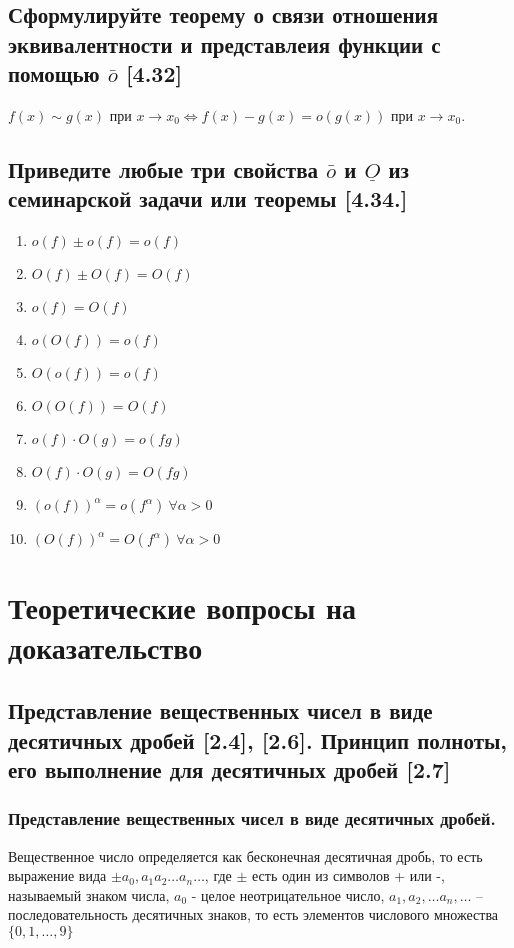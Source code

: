 \documentclass[12pt, a4paper]{article}
\begin{document}
    \subsection{Сформулируйте теорему о связи отношения эквивалентности и представлеия функции с помощью $\bar{o}$ [4.32]}
    $f(x) \sim g(x)$ при $x \to x_0 \Leftrightarrow f(x) - g(x) = o(g(x))$ при $x \to x_0$.
    \subsection{Приведите любые три свойства $\bar{o}$ и $\underline{O}$ из семинарской задачи или теоремы [4.34.]}
    \begin{enumerate}
        \item $o(f) \pm o(f) = o(f)$
        \item $O(f) \pm O(f) = O(f)$
        \item $o(f) = O(f)$
        \item $o(O(f)) = o(f)$
        \item $O(o(f)) = o(f)$
        \item $O(O(f)) = O(f)$
        \item $o(f) \cdot O(g) = o(fg)$
        \item $O(f) \cdot O(g) = O(fg)$
        \item $(o(f))^{\alpha} = o(f^{\alpha}) \ \forall \alpha > 0$
        \item $(O(f))^{\alpha} = O(f^{\alpha}) \ \forall \alpha > 0$
    \end{enumerate}
    \section{Теоретические вопросы на доказательство}
    \subsection{Представление вещественных чисел в виде десятичных дробей [2.4], [2.6]. Принцип полноты, его выполнение для десятичных дробей [2.7]}
    \subsubsection{Представление вещественных чисел в виде десятичных дробей.}
    Вещественное число определяется как бесконечная десятичная дробь, то есть выражение вида $\pm a_0, a_1 a_2 \dots a_n \dots$, где $\pm$ есть один из символов + или -, называемый знаком числа, $a_0$ - целое неотрицательное число, $a_1, a_2, \dots a_n, \dots$ -- последовательность десятичных знаков, то есть элементов числового множества $\{0, 1, \dots, 9\}$
    
\end{document}
